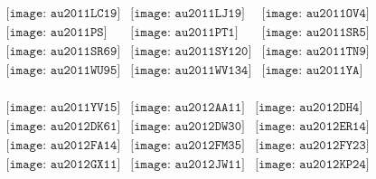 \documentclass{article}
\begin{document}
\begin{figure}[H]
 \begin{center}$
 \begin{array}{cccc}
\texttt{[image: au2011LC19]}&\texttt{[image: au2011LJ19]}&\texttt{[image: au2011OV4]}\\\texttt{[image: au2011PS]}&\texttt{[image: au2011PT1]}&\texttt{[image: au2011SR5]}\\\texttt{[image: au2011SR69]}&\texttt{[image: au2011SY120]}&\texttt{[image: au2011TN9]}\\\texttt{[image: au2011WU95]}&\texttt{[image: au2011WV134]}&\texttt{[image: au2011YA]}\\
\end{array}$
\end{center}
\end{figure}

\begin{figure}[H]
 \begin{center}$
 \begin{array}{cccc}
\texttt{[image: au2011YV15]}&\texttt{[image: au2012AA11]}&\texttt{[image: au2012DH4]}\\\texttt{[image: au2012DK61]}&\texttt{[image: au2012DW30]}&\texttt{[image: au2012ER14]}\\\texttt{[image: au2012FA14]}&\texttt{[image: au2012FM35]}&\texttt{[image: au2012FY23]}\\\texttt{[image: au2012GX11]}&\texttt{[image: au2012JW11]}&\texttt{[image: au2012KP24]}\\
\end{array}$
\end{center}
\end{figure}
\end{document}

